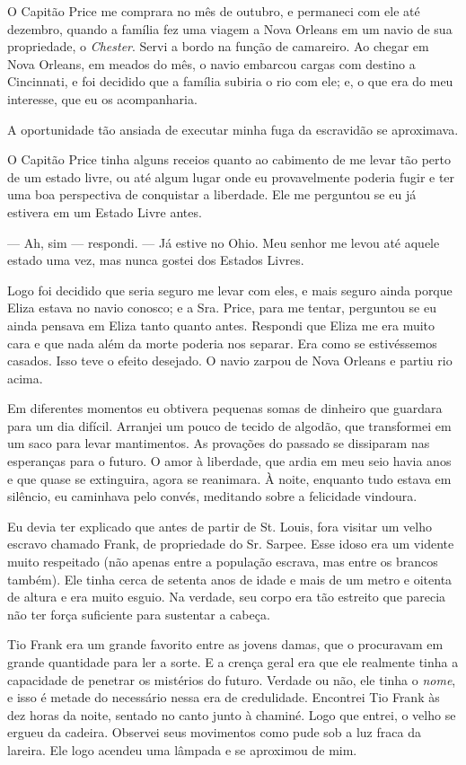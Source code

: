 O Capitão Price me comprara no mês de outubro, e permaneci com ele até
dezembro, quando a família fez uma viagem a Nova Orleans em um navio de
sua propriedade, o \emph{Chester}. Servi a bordo na função de camareiro.
Ao chegar em Nova Orleans, em meados do mês, o navio embarcou cargas com
destino a Cincinnati, e foi decidido que a família subiria o rio com
ele; e, o que era do meu interesse, que eu os acompanharia.

A oportunidade tão ansiada de executar minha fuga da escravidão se
aproximava.

O Capitão Price tinha alguns receios quanto ao cabimento de me levar tão
perto de um estado livre, ou até algum lugar onde eu provavelmente
poderia fugir e ter uma boa perspectiva de conquistar a liberdade. Ele
me perguntou se eu já estivera em um Estado Livre antes.

--- Ah, sim --- respondi. --- Já estive no Ohio. Meu senhor me levou até
aquele estado uma vez, mas nunca gostei dos Estados Livres.

Logo foi decidido que seria seguro me levar com eles, e mais seguro
ainda porque Eliza estava no navio conosco; e a Sra. Price, para me
tentar, perguntou se eu ainda pensava em Eliza tanto quanto antes.
Respondi que Eliza me era muito cara e que nada além da morte poderia
nos separar. Era como se estivéssemos casados. Isso teve o efeito
desejado. O navio zarpou de Nova Orleans e partiu rio acima.

Em diferentes momentos eu obtivera pequenas somas de dinheiro que
guardara para um dia difícil. Arranjei um pouco de tecido de algodão,
que transformei em um saco para levar mantimentos. As provações do
passado se dissiparam nas esperanças para o futuro. O amor à liberdade,
que ardia em meu seio havia anos e que quase se extinguira, agora se
reanimara. À noite, enquanto tudo estava em silêncio, eu caminhava pelo
convés, meditando sobre a felicidade vindoura.

Eu devia ter explicado que antes de partir de St. Louis, fora visitar um
velho escravo chamado Frank, de propriedade do Sr. Sarpee. Esse idoso
era um vidente muito respeitado (não apenas entre a população escrava,
mas entre os brancos também). Ele tinha cerca de setenta anos de idade e
mais de um metro e oitenta de altura e era muito esguio. Na verdade, seu
corpo era tão estreito que parecia não ter força suficiente para
sustentar a cabeça.

Tio Frank era um grande favorito entre as jovens damas, que o procuravam
em grande quantidade para ler a sorte. E a crença geral era que ele
realmente tinha a capacidade de penetrar os mistérios do futuro. Verdade
ou não, ele tinha o \emph{nome}, e isso é metade do necessário nessa era
de credulidade. Encontrei Tio Frank às dez horas da noite, sentado no
canto junto à chaminé. Logo que entrei, o velho se ergueu da cadeira.
Observei seus movimentos como pude sob a luz fraca da lareira. Ele logo
acendeu uma lâmpada e se aproximou de mim.

